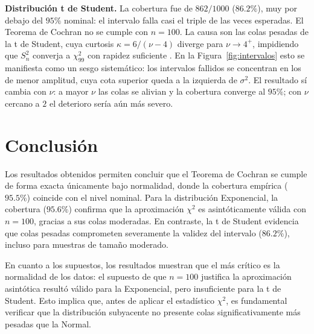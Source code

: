 \documentclass[11pt]{article}
\begin{document}
\textbf{Distribución t de Student.} La cobertura fue de $862/1000$ 
($86.2\%$), muy por debajo del $95\%$ nominal: el intervalo falla casi 
el triple de las veces esperadas. El Teorema de Cochran no se 
cumple con $n=100$. La causa son las colas pesadas de la t de Student, 
cuya curtosis $\kappa = 6/(\nu-4)$ diverge para $\nu \to 4^+$, impidiendo 
que $S_n^2$ converja a $\chi^2_{99}$ con rapidez suficiente \cite{lumley2002importance}. En 
la Figura~\ref{fig:intervalos} esto se manifiesta como un sesgo sistemático: 
los intervalos fallidos se concentran en los de menor amplitud, cuya cota 
superior queda a la izquierda de $\sigma^2$. El resultado sí cambia 
con $\nu$: a mayor $\nu$ las colas se alivian y la cobertura converge al 
$95\%$; con $\nu$ cercano a $2$ el deterioro sería aún más severo.

\section{Conclusión}

Los resultados obtenidos permiten concluir que el Teorema de Cochran se cumple 
de forma exacta únicamente bajo normalidad, donde la cobertura empírica 
($95.5\%$) coincide con el nivel nominal. Para la distribución Exponencial, 
la cobertura ($95.6\%$) confirma que la aproximación $\chi^2$ es 
asintóticamente válida con $n=100$, gracias a sus colas moderadas. En 
contraste, la t de Student evidencia que colas pesadas comprometen 
severamente la validez del intervalo ($86.2\%$), incluso para muestras 
de tamaño moderado.

En cuanto a los supuestos, los resultados muestran que el más crítico es la 
normalidad de los datos: el supuesto de que $n=100$ justifica la 
aproximación asintótica resultó válido para la Exponencial, pero insuficiente 
para la t de Student. Esto implica que, antes de aplicar el estadístico 
$\chi^2$, es fundamental verificar que la distribución subyacente no presente 
colas significativamente más pesadas que la Normal.

\newpage

\end{document}
